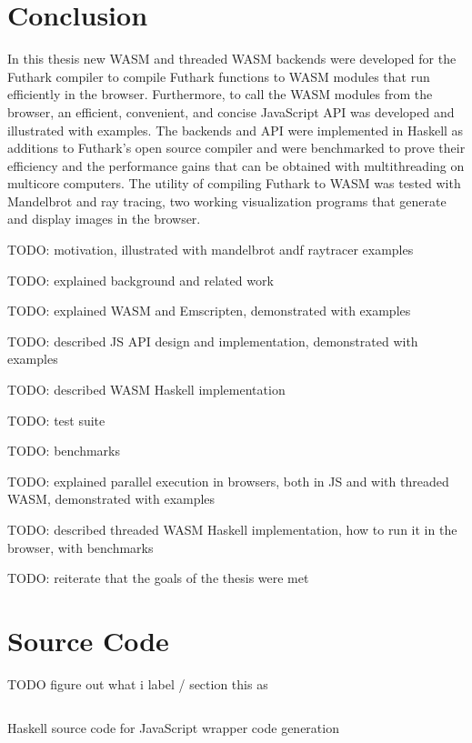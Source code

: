 \documentclass[11pt]{book}
\begin{document}
\chapter{Conclusion}

In this thesis new WASM and threaded WASM backends were developed for the Futhark compiler to compile Futhark functions to WASM modules that run efficiently in the browser. Furthermore, to call the WASM modules from the browser, an efficient, convenient, and concise JavaScript API was developed and illustrated with examples. 
The backends and API were implemented in Haskell as additions to Futhark’s open source compiler and were benchmarked to prove their efficiency and the performance gains that can be obtained with multithreading on multicore computers.
The utility of compiling Futhark to WASM was tested with Mandelbrot and ray tracing, two working visualization programs that generate and display images in the browser.

TODO: motivation, illustrated with mandelbrot andf raytracer examples

TODO: explained background and related work

TODO: explained WASM and Emscripten, demonstrated with examples

TODO: described JS API design and implementation, demonstrated with examples

TODO: described WASM Haskell implementation

TODO: test suite

TODO: benchmarks

TODO: explained parallel execution in browsers, both in JS and with threaded WASM, demonstrated with examples

TODO: described threaded WASM Haskell implementation, how to run it in the browser, with benchmarks

TODO: reiterate that the goals of the thesis were met



\appendix
\chapter{Source Code}

TODO figure out what i label / section this as


\begin{listing}[H]    
\inputminted[fontsize=\small,baselinestretch=0.5,linenos]{Haskell}{code/compiler/codegen/GenericWASM.hs}
        \caption{Haskell source code for JavaScript wrapper code generation}    
        \label{lst:generic_wasm}    
\end{listing}  




\printbibliography[heading=bibintoc]
\end{document}

